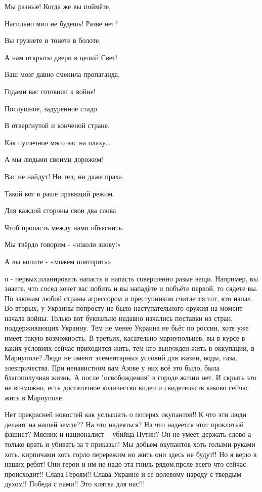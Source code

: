 Мы разные! Когда же вы поймёте,

Насильно мил не будешь! Разве нет?

Вы грузнете и тонете в болоте,

А нам открыты двери в целый Свет!


Ваш мозг давно сменила пропаганда,

Годами вас готовили к войне!

Послушное, задуренное стадо

В отвергнутой и конченой стране.


Как пушечное мясо вас на плаху…

А мы людьми своими дорожим!

Вас не найдут! Ни тел, ни даже праха.

Такой вот в раше правящий режим.


Для каждой стороны свои два слова,

Чтоб пропасть между нами объяснить.

Мы твёрдо говорим - «ніколи знову!»

А вы вопите - «можем повторить»

о - первых,планировать напасть и напасть совершенно разые вещи.
Например, вы знаете, что сосед хочет вас побить и вы нападёте и побъёте первой, то сядете вы. По законам любой страны агрессором и преступником считается тот, кто напал.
Во-вторых, у Украины попросту не было наступательного оружия на момент начала войны. Только вот буквально недавно начались поставки из стран, поддерживающих Украину.
Тем не менее Украина не бьёт по россии, хотя уже имеет такую возможность.
В третьих, касательно мариупольцев, вы в курсе в каких условиях сейчас приходится жить, тем кто вынужден жить в оккупации, в Мариуполе? Люди не имеют элементарных условий для жизни, воды, газа, электричества. При ненавистном вам Азове у них всё это было, была благополучная жизнь. А после "освобождения" в городе жизни нет. И скрыть это не возможно, есть достаточное количество видео и свидетельств каково сейчас жить в Мариуполе.

Нет прекрасней новостей как услышать о потерях окупантов!! К что эти люди
делают на нашей земле?? На что надеяться? На что надеется этот проклятый
фашист? Мясник и националист -- убийца Путин? Он не умеет держать слово а
только врать и убивать за т приказы!! Мы добьем окупантов хоть голыми руками
хоть. кирпичами хоть горло перережим но жить они здесь не будут!! Но я верю в
наших ребят! Они герои и им не надо эта гниль рядом.прсле всего что сейчас
происходит!! Слава Героям!! Слава Украине и ее волевому народу с твердым
духом!! Победа с нами!! Это клятва для нас!!!

